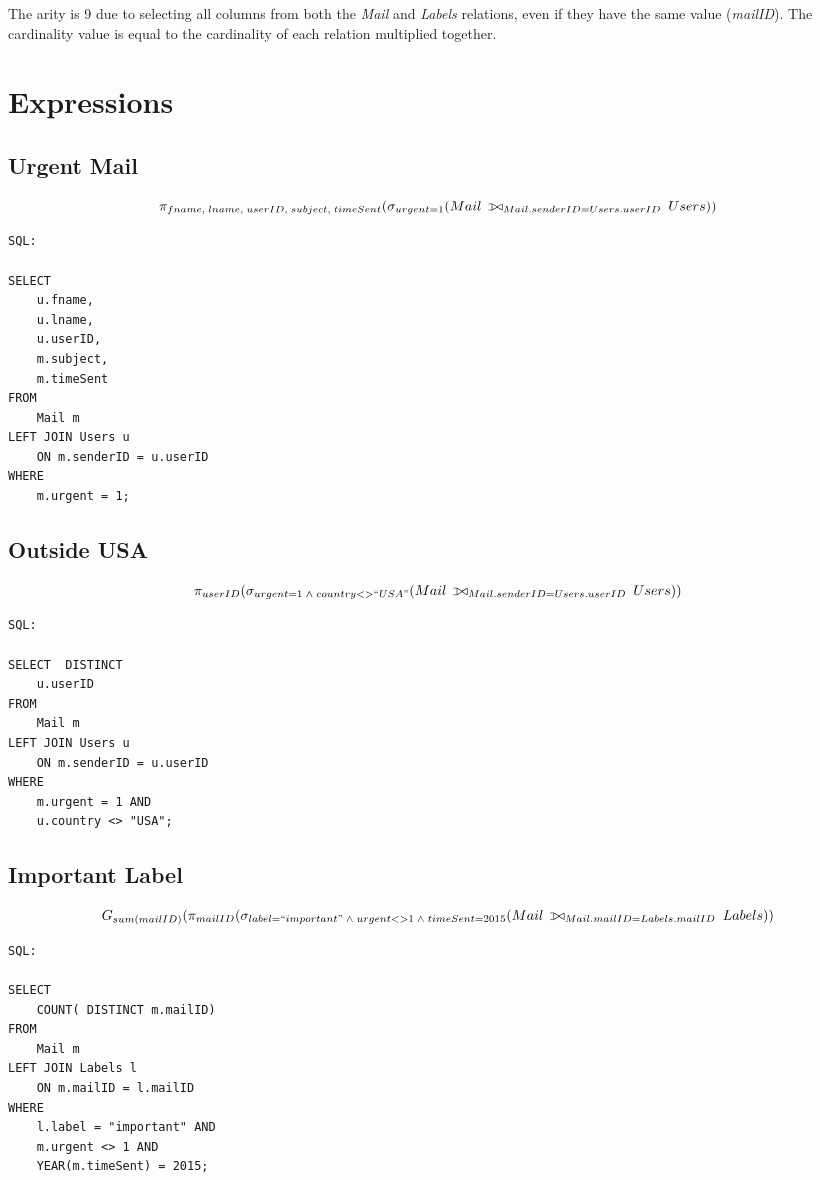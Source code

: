 \documentclass[12pt, letterpaper]{report}
\def\ojoin{\setbox0=\hbox{$\bowtie$}
\rule[-.02ex]{.25em}{.4pt}\llap{\rule[\ht0]{.25em}{.4pt}}}
\def\leftouterjoin{\mathbin{\ojoin\mkern-5.8mu\bowtie}}
\begin{document}
The arity is 9 due to selecting all columns from both the \textit{Mail} and \textit{Labels} relations, even if they have the same value (\textit{mailID}). The cardinality value is equal to the cardinality of each relation multiplied together.

\section{Expressions}

\subsection{Urgent Mail}

\[ \pi_{fname,\;lname,\;userID,\;subject,\;timeSent} (\sigma_{urgent=1} (Mail\;\leftouterjoin_{Mail.senderID=Users.userID}\;Users) )  \]

\begin{verbatim}
SQL:

SELECT 
    u.fname,
    u.lname,
    u.userID,
    m.subject,
    m.timeSent
FROM
    Mail m
LEFT JOIN Users u
    ON m.senderID = u.userID
WHERE
    m.urgent = 1;

\end{verbatim}


\subsection{Outside USA}

\[ \pi_{userID} (\sigma_{urgent=1\;\wedge\;country <> ``USA"} (Mail\;\leftouterjoin_{Mail.senderID=Users.userID}\;Users) )  \]

\begin{verbatim}
SQL:

SELECT  DISTINCT
    u.userID
FROM
    Mail m
LEFT JOIN Users u
    ON m.senderID = u.userID
WHERE
    m.urgent = 1 AND
    u.country <> "USA";

\end{verbatim}

\subsection{Important Label}

\[ G_{sum(mailID)} (\pi_{mailID} (\sigma_{label=``important"\;\wedge\;urgent<>1\;\wedge\;timeSent=2015} (Mail\;\leftouterjoin_{Mail.mailID=Labels.mailID}\;Labels ))  \]

\begin{verbatim}
SQL:

SELECT 
    COUNT( DISTINCT m.mailID)
FROM
    Mail m
LEFT JOIN Labels l
    ON m.mailID = l.mailID
WHERE
    l.label = "important" AND
    m.urgent <> 1 AND
    YEAR(m.timeSent) = 2015;

\end{verbatim}
\end{document}
